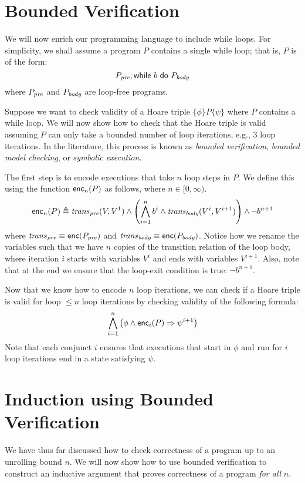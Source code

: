 \documentclass{amsart}
\theoremstyle{definition}
\theoremstyle{remark}
\numberwithin{equation}{section}
\begin{document}
\section{Bounded Verification}
We will now enrich our programming language to include while loops.
For simplicity, we shall assume  a program $P$ contains
a single while loop; that is, $P$ is of the form:
$$P_{\emph{pre}}; \mathsf{while}~ b ~\mathsf{do}~ P_{\emph{body}}$$
where $P_{\emph{pre}}$ and $P_{\emph{body}}$ are loop-free programs.

Suppose we want to check validity of a
Hoare triple $\{\phi\} P \{\psi\}$
where $P$ contains a while loop.
We will now show how to check that the Hoare triple
is valid assuming $P$ can only take a bounded number
of loop iterations, e.g., 3 loop iterations.
In the literature, this process is known as \emph{bounded verification},
\emph{bounded model checking}, or \emph{symbolic execution}.

The first step is to encode executions that take $n$
loop steps in $P$.
We define this using the function
$\mathsf{enc}_n(P)$ as follows, where $n \in [0,\infty)$.
%
\begin{align*}
\mathsf{enc}_n(P) \triangleq
\mathit{trans}_{\emph{pre}}(V,V^1) \land
\left(\bigwedge_{i = 1}^{n}
b^i \land \mathit{trans}_{\emph{body}}(V^i, V^{i+1})\right)
\land \neg b^{n+1}
\end{align*}
%
where $\mathit{trans}_{\emph{pre}} \equiv \mathsf{enc}(P_{\emph{pre}})$
and $\mathit{trans}_{\emph{body}} \equiv \mathsf{enc}(P_{\emph{body}})$.
Notice how we rename the variables such that
we have $n$ copies of the transition relation
of the loop body,
where iteration $i$ starts with variables $V^i$
and ends with variables $V^{i+1}$.
Also, note that at the end we ensure that the loop-exit condition is true: $\neg b^{n+1}$.

Now that we know how to encode $n$
loop iterations, we can check if a Hoare triple
is valid for loop  $\leq n$ loop iterations by
checking validity of the following formula:
\begin{align*}
  \bigwedge_{i=1}^n \left(\phi \land \mathsf{enc}_i(P) \Rightarrow \psi^{i+1}\right)
\end{align*}
Note that each conjunct $i$ ensures
that executions that start in $\phi$
and run for $i$ loop iterations end in a state satisfying
$\psi$.

\section{Induction using Bounded Verification}
We have thus far discussed how to check correctness
of a program up to an unrolling bound $n$.
We will now show how to use bounded verification
to construct an inductive argument that proves
correctness of a program \emph{for all} $n$.
\end{document}
